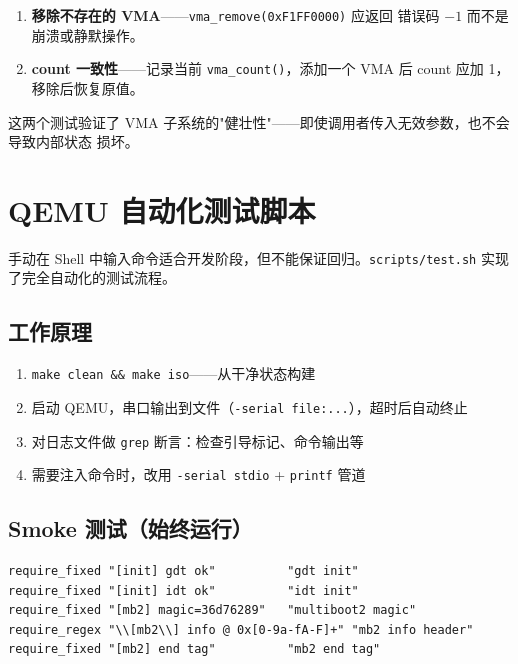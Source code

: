 \begin{enumerate}
  \item[8.] \textbf{移除不存在的 VMA}——\texttt{vma\_remove(0xF1FF0000)} 应返回
    错误码 $-1$ 而不是崩溃或静默操作。
  \item[9.] \textbf{count 一致性}——记录当前 \texttt{vma\_count()}，添加一个 VMA
    后 count 应加 1，移除后恢复原值。
\end{enumerate}

这两个测试验证了 VMA 子系统的"健壮性"——即使调用者传入无效参数，也不会导致内部状态
损坏。


\section{QEMU 自动化测试脚本}
\label{sec:test-script}

手动在 Shell 中输入命令适合开发阶段，但不能保证回归。\texttt{scripts/test.sh}
实现了完全自动化的测试流程。

\subsection{工作原理}

\begin{enumerate}
  \item \texttt{make clean \&\& make iso}——从干净状态构建
  \item 启动 QEMU，串口输出到文件（\texttt{-serial file:...}），超时后自动终止
  \item 对日志文件做 \texttt{grep} 断言：检查引导标记、命令输出等
  \item 需要注入命令时，改用 \texttt{-serial stdio} + \texttt{printf} 管道
\end{enumerate}

\subsection{Smoke 测试（始终运行）}

\begin{lstlisting}[style=shellstyle]
require_fixed "[init] gdt ok"          "gdt init"
require_fixed "[init] idt ok"          "idt init"
require_fixed "[mb2] magic=36d76289"   "multiboot2 magic"
require_regex "\\[mb2\\] info @ 0x[0-9a-fA-F]+" "mb2 info header"
require_fixed "[mb2] end tag"          "mb2 end tag"
\end{lstlisting}

